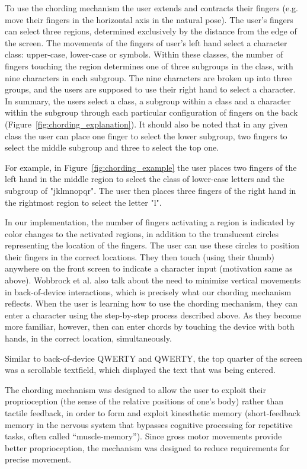 To use the chording mechanism the user extends and contracts their fingers (e.g. move their fingers in the horizontal axis in the natural pose). The user's fingers can select three regions, determined exclusively by the distance from the edge of the screen. The movements of the fingers of user's left hand select a character class: upper-case, lower-case or symbols. Within these classes, the number of fingers touching the region determines one of three subgroups in the class, with nine characters in each subgroup. The nine characters are broken up into three groups, and the users are supposed to use their right hand to select a character. In summary, the users select a class, a subgroup within a class and a character within the subgroup through each particular configuration of fingers on the back (Figure~\ref{fig:chording_explanation}). It should also be noted that in any given class the user can place one finger to select the lower subgroup, two fingers to select the middle subgroup and three to select the top one.

For example, in Figure~\ref{fig:chording_example} the user places two fingers of the left hand in the middle region to select the class of lower-case letters and the subgroup of "jklmnopqr". The user then places three fingers of the right hand in the rightmost region to select the letter "l".

In our implementation, the number of fingers activating a region is indicated by color changes to the activated regions, in addition to the translucent circles representing the location of the fingers. The user can use these circles to position their fingers in the correct locations. They then touch (using their thumb) anywhere on the front screen to indicate a character input (motivation same as above). Wobbrock et al. \cite{Wobbrock} also talk about the need to minimize vertical movements in back-of-device interactions, which is precisely what our chording mechanism reflects. When the user is learning how to use the chording mechanism, they can enter a character using the step-by-step process described above.  As they become more familiar, however, then can enter chords by touching the device with both hands, in the correct location, simultaneously.

Similar to back-of-device QWERTY and QWERTY, the top quarter of the screen was a scrollable textfield, which displayed the text that was being entered.

The chording mechanism was designed to allow the user to exploit their proprioception (the sense of the relative positions of one's body) rather than tactile feedback, in order to form and exploit kinesthetic memory (short-feedback memory in the nervous system that bypasses cognitive processing for repetitive tasks, often called ``muscle-memory''). Since gross motor movements provide better proprioception, the mechanism was designed to reduce requirements for precise movement.


